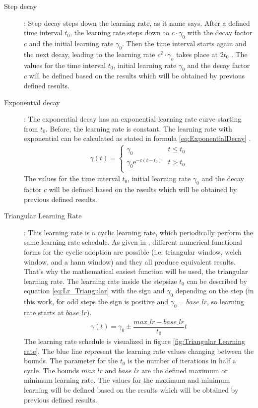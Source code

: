 \documentclass[12pt,DIV14,BCOR12mm,a4paper,footexclude,headinclude,halfparskip-,twoside,openright,openany,cleardoubleempty,idxtotoc,bibtotoc]{scrreprt} %
\numberwithin{equation}{chapter}
\begin{document}
\begin{description}
	\begin{description}
		\item[Step decay]: Step decay steps down the learning rate, as it name says. After a defined time interval $t_0$, the learning rate steps down to $c\cdot\gamma_0$ with the decay factor $c$ and the initial learning rate $\gamma_0$. Then the time interval starts again and the next decay, leading to the learning rate $c^2\cdot\gamma_o$ takes place at $2t_0$ \cite{LectureNotes_DeepLearning}. The values for the time interval $t_0$, initial learning rate $\gamma_0$ and the decay factor $c$ will be defined based on the results which will be obtained by previous defined results.
		\item[Exponential decay]: The exponential decay has an exponential learning rate curve starting from $t_0$. Before, the learning rate is constant. The learning rate with exponential can be calculated as stated in formula \ref{eq:ExponentialDecay} \cite{LectureNotes_DeepLearning}.
		\begin{align}
			\gamma(t) = \begin{cases} \gamma_0 & t \leq t_0\\\gamma_0\textrm{e}^{-c(t-t_0)} & t > t_0\\ \end{cases}\label{eq:ExponentialDecay}
		\end{align}
		The values for the time interval $t_0$, initial learning rate $\gamma_0$ and the decay factor $c$ will be defined based on the results which will be obtained by previous defined results.
		\item[Triangular Learning Rate]: This learning rate is a cyclic learning rate, which periodically perform the same learning rate schedule. As given in \cite{Smith15CyclicLearningRate}, different numerical functional forms for the cyclic adoption are possible (i.e. triangular window, welch window, and a hann window) and they all produce equivalent results. That's why the mathematical easiest function will be used, the triangular learning rate. The learning rate inside the stepsize $t_0$ can be described by equation \ref{eq:Lr_Triangular} with the sign and $\gamma_0$ depending on the step (in this work, for odd steps the sign is positive and $\gamma_0 = base\_lr$, so learning rate starts at $base\_lr$).
		\begin{align}
			\gamma(t) = \gamma_0\pm\dfrac{max\_lr-base\_lr}{t_0}t\label{eq:Lr_Triangular}
		\end{align}		
		The learning rate schedule is visualized in figure \ref{fig:Triangular Learning rate}. The blue line represent the learning rate values changing between the bounds. The parameter for the $t_0$ is the number of iterations in half a cycle. The bounds $max\_lr$ and $base\_lr$ are the defined maximum or minimum learning rate. The values for the maximum and minimum learning will be defined based on the results which will be obtained by previous defined results.

\end{description}
\end{description}
\end{document}
